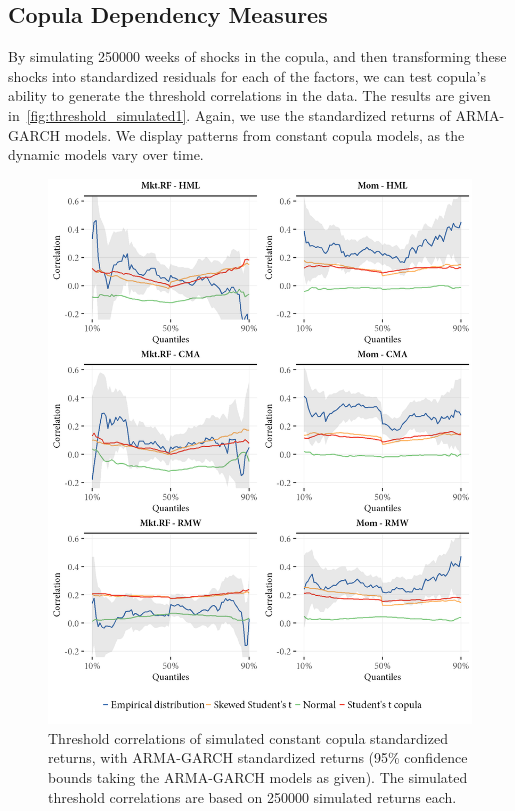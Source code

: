 
\subsection{Copula Dependency Measures} %
\label{sub:copula_dependency_measures}

By simulating 250000 weeks of shocks in the copula, and then transforming these shocks into standardized residuals for each of the factors, we can test copula's ability to generate the threshold correlations in the data. The results are given in~\autoref{fig:threshold_simulated1}. Again, we use the standardized returns of ARMA-GARCH models. We display patterns from constant copula models, as the dynamic models vary over time.

\begin{figure}[!ht]
  \centering
  \includegraphics[scale=1]{graphics/threshold_simulated_1.png}  

  \caption{Threshold correlations of simulated constant copula standardized returns, with ARMA-GARCH standardized returns (95\% confidence bounds taking the ARMA-GARCH models as given). The simulated threshold correlations are based on 250000 simulated returns each.}
  
  \label{fig:threshold_simulated1}
\end{figure}
